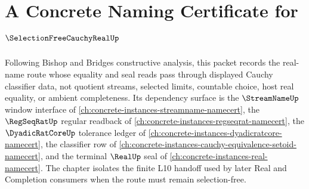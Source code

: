 \chapter{A Concrete Naming Certificate for $\SelectionFreeCauchyRealUp$}
\label{ch:concrete-instances-selection-free-cauchy-real-namecert}

Following Bishop and Bridges constructive analysis, this packet records the real-name route whose equality and seal reads pass through displayed Cauchy classifier data, not quotient streams, selected limits, countable choice, host real equality, or ambient completeness. Its dependency surface is the $\StreamNameUp$ window interface of \autoref{ch:concrete-instances-streamname-namecert}, the $\RegSeqRatUp$ regular readback of \autoref{ch:concrete-instances-regseqrat-namecert}, the $\DyadicRatCoreUp$ tolerance ledger of \autoref{ch:concrete-instances-dyadicratcore-namecert}, the classifier row of \autoref{ch:concrete-instances-cauchy-equivalence-setoid-namecert}, and the terminal $\RealUp$ seal of \autoref{ch:concrete-instances-real-namecert}. The chapter isolates the finite L10 handoff used by later Real and Completion consumers when the route must remain selection-free.

